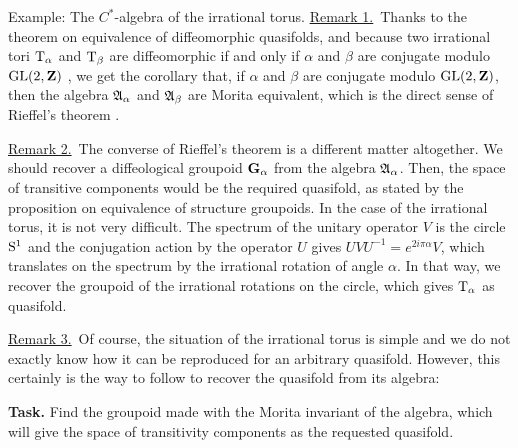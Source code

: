 \begin{Article}{Example: The $C^*$-algebra of the irrational torus.}{}
  \uline{Remark 1.}~Thanks to the theorem on equivalence of diffeomorphic quasifolds,
  and because two irrational tori $\mathrm{T}_\alpha$ and $\mathrm{T}_\beta$ are diffeomorphic if and only if $\alpha$ and $\beta$ are conjugate modulo $\mathrm{GL}(2,\mathbf{Z})$ \cite{DI83},
  we get the corollary that,
  if $\alpha$ and $\beta$ are conjugate modulo $\mathrm{GL}(2,\mathbf{Z})$,
  then the algebra ${\mathfrak A}_\alpha$ and ${\mathfrak A}_\beta$ are Morita equivalent,
  which is the direct sense of Rieffel's theorem \cite[Thm 4]{Rie81}.
  
  \uline{Remark 2.}~The converse of Rieffel's theorem is a different matter altogether.
  We should recover a diffeological groupoid ${\mathbf G}_\alpha$ from the algebra ${\mathfrak A}_\alpha$.
  Then,
  the space of transitive components would be the required quasifold,
  as stated by the proposition on equivalence of structure groupoids.
  In the case of the irrational torus,
  it is not very difficult.
  The spectrum of the unitary operator $V$ is the circle $\mathrm{S}^1$ and the conjugation action by the operator $U$ gives $UVU^{-1} = e^{2i\pi \alpha} V$,
  which translates on the spectrum by the irrational rotation of angle $\alpha$.
  In that way,
  we recover the groupoid of the irrational rotations on the circle,
  which gives $\mathrm{T}_\alpha$ as quasifold.
  
  \uline{Remark 3.}~Of course,
  the situation of the irrational torus is simple and we do not exactly know how it can be reproduced for an arbitrary quasifold.
  However, this certainly is the way to follow to recover the quasifold from its algebra:
  
  \textbf{Task.} Find the groupoid made with the Morita invariant of the algebra,
  which will give the space of transitivity components as the requested quasifold.
\end{Article} %

